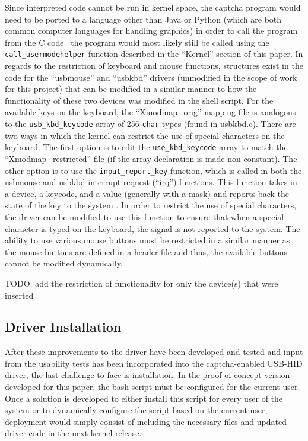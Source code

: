 \documentclass[pagenumbers]{ieee}
\begin{document}
Since interpreted code cannot be run in kernel space, the captcha program would need to be ported to a language other than Java or Python (which are both common computer languages for handling graphics) in order to call the program from the C code \textemdash \ the program would most likely still be called using the \texttt{call\_usermodehelper} function described in the ``Kernel'' section of this paper. In regards to the restriction of keyboard and mouse functions, structures exist in the code for the ``usbmouse'' and ``usbkbd'' drivers (unmodified in the scope of work for this project) that can be modified in a similar manner to how the functionality of these two devices was modified in the shell script. For the available keys on the keyboard, the ``Xmodmap\_orig'' mapping file is  analogous to the \texttt{usb\_kbd\_keycode} array of 256 \texttt{char} types (found in usbkbd.c). There are two ways in which the kernel can restrict the use of special characters on the keyboard. The first option is to edit the \texttt{use\_kbd\_keycode} array to match the ``Xmodmap\_restricted'' file (if the array declaration is made non-constant). The other option is to use the \texttt{input\_report\_key} function, which is called in both the usbmouse and usbkbd interrupt request (``irq'') functions. This function takes in a device, a keycode, and a value (generally with a mask) and reports back the state of the key to the system \cite{input}. In order to restrict the use of special characters, the driver can be modified to use this function to ensure that when a special character is typed on the keyboard, the signal is not reported to the system. The ability to use various mouse buttons must be restricted in a similar manner as the mouse buttons are defined in a header file and thus, the available buttons cannot be modified dynamically.

TODO: add the restriction of functionality for only the device(s) that were inserted

\subsection{Driver Installation}
\label{section:installation}

After these improvements to the driver have been developed and tested and input from the usability tests has been incorporated into the captcha-enabled USB-HID driver, the last challenge to face is installation. In the proof of concept version developed for this paper, the bash script must be configured for the current user. Once a solution is developed to either install this script for every user of the system or to dynamically configure the script based on the current user, deployment would simply consist of including the necessary files and updated driver code in the next kernel release.
\end{document}
